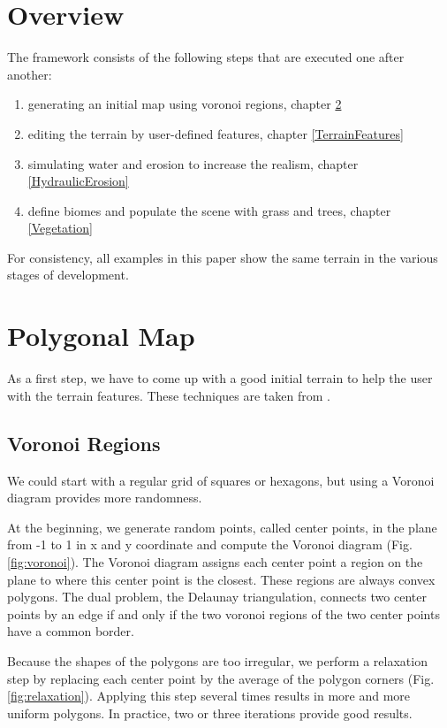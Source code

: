 \documentclass[journal, letterpaper]{IEEEtran}
\begin{document}
\section{Overview}
The framework consists of the following steps that are executed one after another:
\begin{enumerate}
	\item generating an initial map using voronoi regions, chapter \ref{PolygonalMap}
	\item editing the terrain by user-defined features, chapter \ref{TerrainFeatures}
	\item simulating water and erosion to increase the realism, chapter \ref{HydraulicErosion}
	\item define biomes and populate the scene with grass and trees, chapter \ref{Vegetation}
\end{enumerate}
For consistency, all examples in this paper show the same terrain in the various stages of development.

\section{Polygonal Map}\label{PolygonalMap}
As a first step, we have to come up with a good initial terrain to help the user with the terrain features.
These techniques are taken from \cite{AmitPatel.2010}.

\subsection{Voronoi Regions}
We could start with a regular grid of squares or hexagons, but using a Voronoi diagram provides more randomness.

At the beginning, we generate random points, called center points, in the plane from -1 to 1 in x and y coordinate and compute the Voronoi diagram (Fig. \ref{fig:voronoi}).
The Voronoi diagram assigns each center point a region on the plane to where this center point is the closest. These regions are always convex polygons. The dual problem, the Delaunay triangulation, connects two center points by an edge if and only if the two voronoi regions of the two center points have a common border.

Because the shapes of the polygons are too irregular, we perform a relaxation step by replacing each center point by the average of the polygon corners (Fig. \ref{fig:relaxation}).
Applying this step several times results in more and more uniform polygons. In practice, two or three iterations provide good results.
\end{document}
